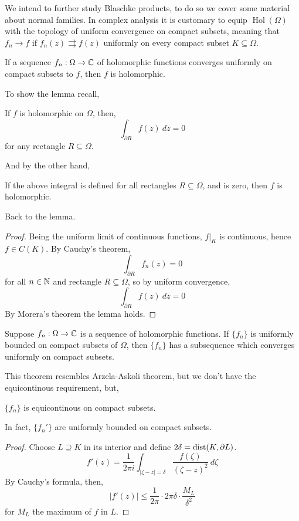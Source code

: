 We intend to further study Blaschke products, to do so we cover some material about normal families.
In complex analysis it is customary to equip $\operatorname{Hol}(\Omega)$ with the topology of uniform convergence on compact subsets,
meaning that $f_n \to f$ if $f_n(z) \rightrightarrows f(z)$ uniformly on every compact subset $K \subseteq \Omega$.
\begin{lemma}
	If a sequence $f_n : \Omega \to \mathbb{C}$ of holomorphic functions converges uniformly on compact subsets to $f$, then $f$ is holomorphic.
\end{lemma}
To show the lemma recall,
\begin{theorem}[Cauchy]
	If $f$ is holomorphic on $\Omega$, then,
	\[
		\int_{\partial R} f(z)\ dz
		= 0
	\]
	for any rectangle $R \subseteq \Omega$.
\end{theorem}
And by the other hand,
\begin{theorem}[Morera]
	If the above integral is defined for all rectangles $R \subseteq \Omega$, and is zero, then $f$ is holomorphic.
\end{theorem}
Back to the lemma.
\begin{proof}
	Being the uniform limit of continuous functions, $f |_K$ is continuous, hence $f \in C(K)$.
	By Cauchy's theorem,
	\[
		\int_{\partial R} f_n(z) = 0
	\]
	for all $n \in \mathbb{N}$ and rectangle $R \subseteq \Omega$, so by uniform convergence,
	\[
		\int_{\partial R} f(z)\ dz
		= 0
	\]
	By Morera's theorem the lemma holds.
\end{proof}
\begin{theorem}[Montel]
	Suppose $f_n : \Omega \to \mathbb{C}$ is a sequence of holomorphic functions.
	If $\{ f_n \}$ is uniformly bounded on compact subsets of $\Omega$, then $\{ f_n \}$ has a subsequence which converges uniformly on compact subsets.
\end{theorem}
This theorem resembles Arzela-Askoli theorem, but we don't have the equicontinous requirement, but,
\begin{proposition}
	$\{ f_n \}$ is equicontinous on compact subsets.
\end{proposition}
In fact, $\{ f_n' \}$ are uniformly bounded on compact subsets.
\begin{proof}
	Choose $L \supseteq K$ in its interior and define $2 \delta = \operatorname{dist}(K, \partial L)$.
	\[
		f'(z)
		= \frac{1}{2 \pi i} \int_{|\zeta - z| = \delta} \frac{f(\zeta)}{{(\zeta - z)}^2}\ d \zeta
	\]
	By Cauchy's formula, then,
	\[
		|f'(z)|
		\le \frac{1}{2 \pi} \cdot 2 \pi \delta \cdot \frac{M_L}{\delta^2}
	\]
	for $M_L$ the maximum of $f$ in $L$.
\end{proof}
